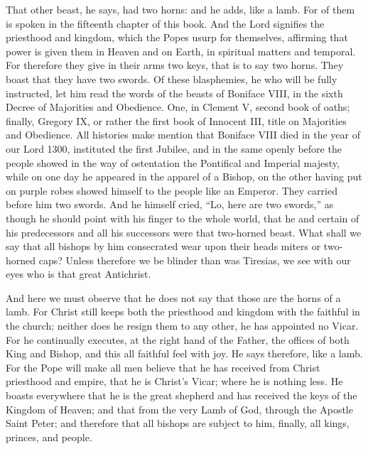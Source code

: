 That other beast, he says, had two horns: and he adds, like a lamb. For of them is spoken in the fifteenth chapter of this book. And the Lord signifies the priesthood and kingdom, which the Popes usurp for themselves, affirming that power is given them in Heaven and on Earth, in spiritual matters and temporal. For therefore they give in their arms two keys, that is to say two horns. They boast that they have two swords. Of these blasphemies, he who will be fully instructed, let him read the words of the beasts of Boniface VIII, in the sixth Decree of Majorities and Obedience. One, in Clement V, second book of oaths; finally, Gregory IX, or rather the first book of Innocent III, title on Majorities and Obedience. All histories make mention that Boniface VIII died in the year of our Lord 1300, instituted the first Jubilee, and in the same openly before the people showed in the way of ostentation the Pontifical and Imperial majesty, while on one day he appeared in the apparel of a Bishop, on the other having put on purple robes showed himself to the people like an Emperor. They carried before him two swords. And he himself cried, “Lo, here are two swords,” as though he should point with his finger to the whole world, that he and certain of his predecessors and all his successors were that two-horned beast. What shall we say that all bishops by him consecrated wear upon their heads miters or two-horned caps? Unless therefore we be blinder than was Tiresias, we see with our eyes who is that great Antichrist.

And here we must observe that he does not say that those are the horns of a lamb. For Christ still keeps both the priesthood and kingdom with the faithful in the church; neither does he resign them to any other, he has appointed no Vicar. For he continually executes, at the right hand of the Father, the offices of both King and Bishop, and this all faithful feel with joy. He says therefore, like a lamb. For the Pope will make all men believe that he has received from Christ priesthood and empire, that he is Christ’s Vicar; where he is nothing less. He boasts everywhere that he is the great shepherd and has received the keys of the Kingdom of Heaven; and that from the very Lamb of God, through the Apostle Saint Peter; and therefore that all bishops are subject to him, finally, all kings, princes, and people.

